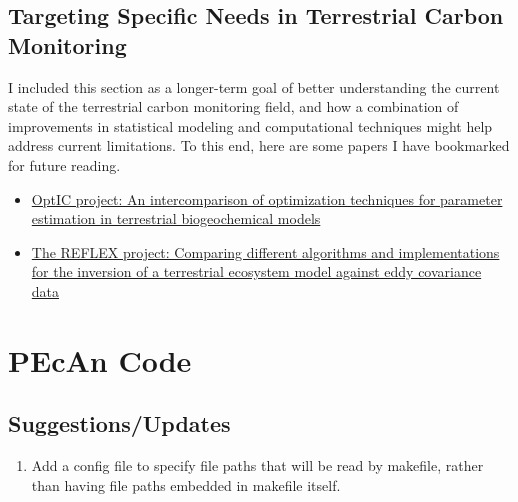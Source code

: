 \documentclass[12pt]{article}
\begin{document}
\subsection{Targeting Specific Needs in Terrestrial Carbon Monitoring}
I included this section as a longer-term goal of better understanding the current state of the terrestrial carbon monitoring field, and how a combination 
of improvements in statistical modeling and computational techniques might help address current limitations. To this end, here are some papers I have bookmarked 
for future reading. 
\begin{itemize}
\item \href{https://www.globalcarbonproject.org/global/pdf/trudinger.07_opti_jgr.pdf}{OptIC project: An intercomparison of optimization techniques for parameter estimation in terrestrial biogeochemical models}
\item \href{https://centaur.reading.ac.uk/28464/1/Fox_etal.REFLEX.AFM.2009.pdf}{The REFLEX project: Comparing different algorithms and implementations for the inversion of a terrestrial ecosystem model against eddy covariance data}
\end{itemize}



\section{PEcAn Code}
\subsection{Suggestions/Updates}
\begin{enumerate}
\item Add a config file to specify file paths that will be read by makefile, rather than having file paths embedded in makefile itself. 
\end{enumerate}
\end{document}
